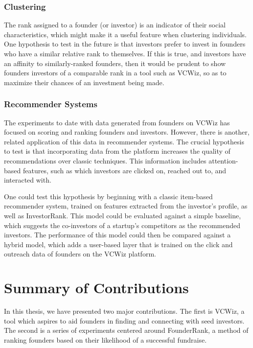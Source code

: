 \subsubsection{Clustering}

The rank assigned to a founder (or investor) is an indicator of their social characteristics, which might make it a useful feature when clustering individuals. One hypothesis to test in the future is that investors prefer to invest in founders who have a similar relative rank to themselves. If this is true, and investors have an affinity to similarly-ranked founders, then it would be prudent to show founders investors of a comparable rank in a tool such as VCWiz, so as to maximize their chances of an investment being made.

\subsubsection{Recommender Systems}

The experiments to date with data generated from founders on VCWiz has focused on scoring and ranking founders and investors. However, there is another, related application of this data in recommender systems. The crucial hypothesis to test is that incorporating data from the platform increases the quality of recommendations over classic techniques. This information includes attention-based features, such as which investors are clicked on, reached out to, and interacted with.

One could test this hypothesis by beginning with a classic item-based recommender system, trained on features extracted from the investor's profile, as well as InvestorRank. This model could be evaluated against a simple baseline, which suggests the co-investors of a startup's competitors as the recommended investors. The performance of this model could then be compared against a hybrid model, which adds a user-based layer that is trained on the click and outreach data of founders on the VCWiz platform.

\section{Summary of Contributions}

In this thesis, we have presented two major contributions. The first is VCWiz, a tool which aspires to aid founders in finding and connecting with seed investors. The second is a series of experiments centered around FounderRank, a method of ranking founders based on their likelihood of a successful fundraise.

